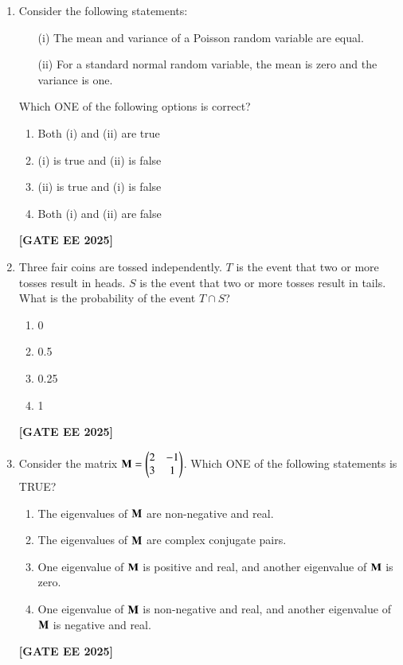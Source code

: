 \documentclass[journal]{IEEEtran}
\newcommand{\qfooter}{%
  \begin{flushright}\footnotesize\textbf{[GATE EE 2025]}\end{flushright}\vspace{1em}%
}
\begin{document}
\begin{enumerate}
\item Consider the following statements:
\begin{itemize}[leftmargin=*]
    \item[(i)] The mean and variance of a Poisson random variable are equal.
    \item[(ii)] For a standard normal random variable, the mean is zero and the variance is one.
\end{itemize}
Which ONE of the following options is correct?
\begin{multicols}{2}
\begin{enumerate}
\item Both (i) and (ii) are true
\item (i) is true and (ii) is false
\item (ii) is true and (i) is false
\item Both (i) and (ii) are false
\end{enumerate} \qfooter
\end{multicols}

\item Three fair coins are tossed independently. $T$ is the event that two or more tosses result in heads. $S$ is the event that two or more tosses result in tails. What is the probability of the event $T \cap S$?
\begin{multicols}{4}
\begin{enumerate}
\item 0
\item 0.5
\item 0.25
\item 1
\end{enumerate} 
\qfooter
\end{multicols}

\item Consider the matrix $\mathbf{M} = \begin{pmatrix}2 & -1\\3 & 1\end{pmatrix}$. Which ONE of the following statements is TRUE?

\begin{enumerate}
\item The eigenvalues of $\mathbf{M}$ are non-negative and real.
\item The eigenvalues of $\mathbf{M}$ are complex conjugate pairs.
\item One eigenvalue of $\mathbf{M}$ is positive and real, and another eigenvalue of $\mathbf{M}$ is zero.
\item One eigenvalue of $\mathbf{M}$ is non-negative and real, and another eigenvalue of $\mathbf{M}$ is negative and real.
\end{enumerate} 
\qfooter



\end{enumerate}
\end{document}
